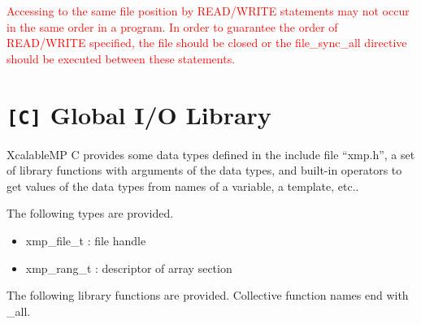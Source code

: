   \textcolor{red}{
   Accessing to the same file position by READ/WRITE statements may not
   occur in the same order in a program. In order to guarantee the order
   of READ/WRITE specified, the file should be closed or the
   file\_sync\_all directive should be executed between these
   statements.
   }
   \fi
   
   \section{{\tt [C]} Global I/O Library}
   XcalableMP C provides some data types defined in the include file ``xmp.h'',
   a set of library functions with arguments of the data types, and
   built-in operators to get values of the data types from names of a variable, a template, etc..

   The following types are provided.

   \begin{itemize}
    \item xmp\_file\_t : file handle
    \item xmp\_rang\_t : descriptor of array section
   \end{itemize}

   The following library functions are provided.
   Collective function names end with \_all.

